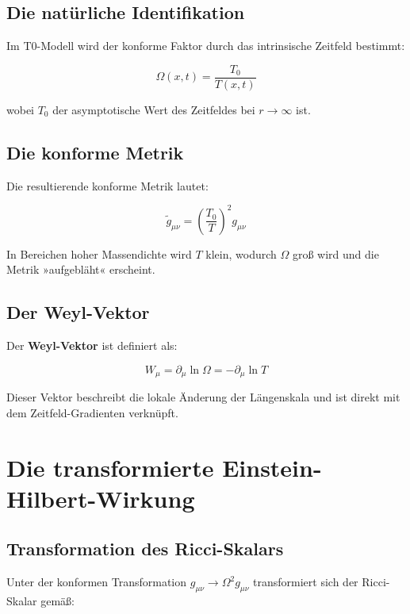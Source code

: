 \documentclass[12pt,a4paper]{report}
\begin{document}
	\subsection{Die natürliche Identifikation}
	
	Im T0-Modell wird der konforme Faktor durch das intrinsische Zeitfeld bestimmt:
	
	\begin{equation}
		\Omega(x,t) = \frac{T_0}{T(x,t)}
	\end{equation}
	
	wobei $T_0$ der asymptotische Wert des Zeitfeldes bei $r \to \infty$ ist.
	
	\subsection{Die konforme Metrik}
	
	Die resultierende konforme Metrik lautet:
	
	\begin{equation}
		\tilde{g}_{\mu\nu} = \left(\frac{T_0}{T}\right)^2 g_{\mu\nu}
	\end{equation}
	
	In Bereichen hoher Massendichte wird $T$ klein, wodurch $\Omega$ groß wird und die Metrik »aufgebläht« erscheint.
	
	\subsection{Der Weyl-Vektor}
	
	Der \textbf{Weyl-Vektor} ist definiert als:
	
	\begin{equation}
		W_\mu = \partial_\mu \ln \Omega = -\partial_\mu \ln T
	\end{equation}
	
	Dieser Vektor beschreibt die lokale Änderung der Längenskala und ist direkt mit dem Zeitfeld-Gradienten verknüpft.
	
	\section{Die transformierte Einstein-Hilbert-Wirkung}
	
	\subsection{Transformation des Ricci-Skalars}
	
	Unter der konformen Transformation $g_{\mu\nu} \to \Omega^2 g_{\mu\nu}$ transformiert sich der Ricci-Skalar gemäß:
	
\end{document}
